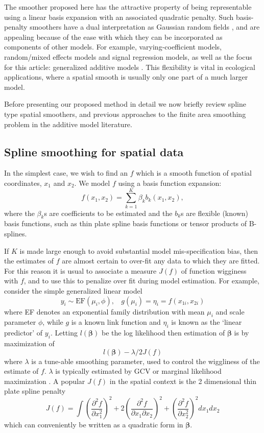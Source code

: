 \documentclass[smallextended]{svjour3}       %
\newcommand{\pdif}[2]{\frac{\partial #1}{\partial #2}}
\newcommand{\pddif}[3]{\frac{\partial^2 #1}{\partial #2 \partial #3}}
\begin{document}
The smoother proposed here has the attractive property of being representable using a linear basis expansion with an associated quadratic penalty. Such basis-penalty smoothers have a dual interpretation as Gaussian random fields \citep{rue2005gaussian}, and are appealing because of the ease with which they can be incorporated as components of other models. For example, varying-coefficient models, random/mixed effects models and signal regression models, as well as the focus for this article: generalized additive models \citep[see e.g.][for overviews]{ruppert2003semiparametric, Wood:2006wz}. This flexibility is vital in ecological applications, where a spatial smooth is usually only one part of a much larger model.

Before presenting our proposed method in detail we now briefly review spline type spatial smoothers, and previous approaches to the finite area smoothing problem in the additive model literature.

\subsection{Spline smoothing for spatial data}

In the simplest case, we wish to find an $f$ which is a smooth function of spatial coordinates, $x_1$ and $x_2$. We model $f$ using a basis function expansion:
\begin{equation}
f(x_{1}, x_{2}) = \sum_{k=1}^K \beta_k b_k(x_{1}, x_{2}),
\label{basis-exp}
\end{equation}
where the $\beta_k$s are coefficients to be estimated and the $b_k$s are flexible (known) basis functions, such as thin plate spline basis functions or tensor products of B-splines. 

If $K$ is made large enough to avoid substantial model mis-specification bias, then the estimates of $f$ are almost certain to over-fit any data to which they are fitted. For this reason it is usual to associate a measure $J(f)$ of function wigginess with $f$, and to use this to penalize over fit during model estimation. 
For example, consider the simple generalized linear model  
$$
y_i \sim \text{EF}(\mu_i, \phi),~~~~ g(\mu_i) = \eta_i =f(x_{1i},x_{2i})
$$
where EF denotes an exponential family distribution with mean $\mu_i$ and scale parameter $\phi$, while $g$ is a known link function and $\eta_i$ is known as the `linear predictor' of $y_i$. Letting $l({\bm \beta})$ be the log likelihood then estimation of $\bm \beta$ is by maximization of 
$$
l({\bm \beta}) - \lambda/2 J(f)
$$ 
where $\lambda$ is a tune-able smoothing parameter, used to control the wiggliness of the estimate of $f$. $\lambda $ is typically estimated by GCV or marginal likelihood maximization \citep{Wood:ub}. A popular $J(f)$ in the spatial context is the 2 dimensional thin plate spline penalty
$$
J(f) = \int \left (\pdif{^2 f}{x_1^2}\right )^2 + 2\left ( \pddif{f}{x_1}{x_2}\right )^2 + \left (\pdif{^2 f}{x_2^2}\right )^2 dx_1 dx_2
$$
which can conveniently be written as a quadratic form in $\bm \beta$. 
\end{document}
